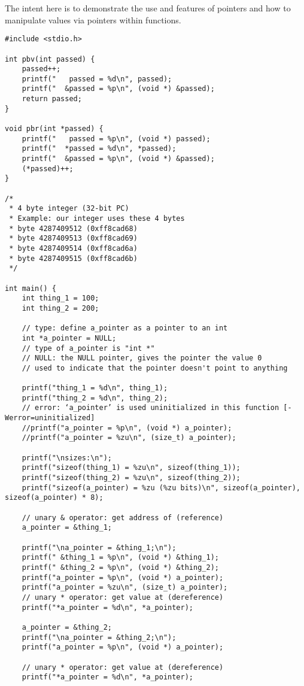 \documentclass[11pt]{article}
\begin{document}
The intent here is to demonstrate the use and features of pointers and
how to manipulate values via pointers within functions.

\begin{verbatim}
#include <stdio.h>

int pbv(int passed) {
    passed++;
    printf("   passed = %d\n", passed);
    printf("  &passed = %p\n", (void *) &passed);
    return passed;
}

void pbr(int *passed) {
    printf("   passed = %p\n", (void *) passed);
    printf("  *passed = %d\n", *passed);
    printf("  &passed = %p\n", (void *) &passed);
    (*passed)++;
}

/*
 * 4 byte integer (32-bit PC)
 * Example: our integer uses these 4 bytes
 * byte 4287409512 (0xff8cad68)
 * byte 4287409513 (0xff8cad69)
 * byte 4287409514 (0xff8cad6a)
 * byte 4287409515 (0xff8cad6b)
 */

int main() {
    int thing_1 = 100;
    int thing_2 = 200;

    // type: define a_pointer as a pointer to an int
    int *a_pointer = NULL;
    // type of a_pointer is "int *"
    // NULL: the NULL pointer, gives the pointer the value 0
    // used to indicate that the pointer doesn't point to anything

    printf("thing_1 = %d\n", thing_1);
    printf("thing_2 = %d\n", thing_2);
    // error: ‘a_pointer’ is used uninitialized in this function [-Werror=uninitialized]
    //printf("a_pointer = %p\n", (void *) a_pointer);
    //printf("a_pointer = %zu\n", (size_t) a_pointer);

    printf("\nsizes:\n");
    printf("sizeof(thing_1) = %zu\n", sizeof(thing_1));
    printf("sizeof(thing_2) = %zu\n", sizeof(thing_2));
    printf("sizeof(a_pointer) = %zu (%zu bits)\n", sizeof(a_pointer), sizeof(a_pointer) * 8);

    // unary & operator: get address of (reference)
    a_pointer = &thing_1;

    printf("\na_pointer = &thing_1;\n");
    printf(" &thing_1 = %p\n", (void *) &thing_1);
    printf(" &thing_2 = %p\n", (void *) &thing_2);
    printf("a_pointer = %p\n", (void *) a_pointer);
    printf("a_pointer = %zu\n", (size_t) a_pointer);
    // unary * operator: get value at (dereference)
    printf("*a_pointer = %d\n", *a_pointer);

    a_pointer = &thing_2;
    printf("\na_pointer = &thing_2;\n");
    printf("a_pointer = %p\n", (void *) a_pointer);

    // unary * operator: get value at (dereference)
    printf("*a_pointer = %d\n", *a_pointer);


\end{verbatim}
\end{document}
